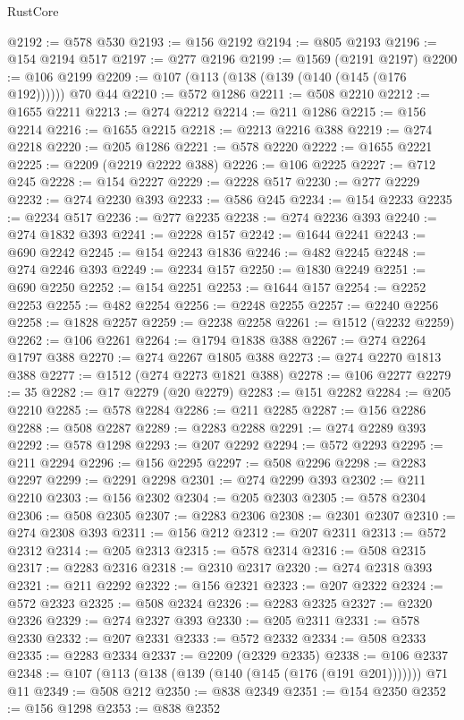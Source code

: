 \begin{lexlean}{RustCore}
\begin{coremodule}
@2192 := @578 @530
@2193 := @156 @2192
@2194 := @805 @2193
@2196 := @154 @2194 @517
@2197 := @277 @2196
@2199 := @1569 (@2191 @2197)
@2200 := @106 @2199
@2209 := @107 (@113 (@138 (@139 (@140 (@145 (@176 @192)))))) @70 @44
@2210 := @572 @1286
@2211 := @508 @2210
@2212 := @1655 @2211
@2213 := @274 @2212
@2214 := @211 @1286
@2215 := @156 @2214
@2216 := @1655 @2215
@2218 := @2213 @2216 @388
@2219 := @274 @2218
@2220 := @205 @1286
@2221 := @578 @2220
@2222 := @1655 @2221
@2225 := @2209 (@2219 @2222 @388)
@2226 := @106 @2225
@2227 := @712 @245
@2228 := @154 @2227
@2229 := @2228 @517
@2230 := @277 @2229
@2232 := @274 @2230 @393
@2233 := @586 @245
@2234 := @154 @2233
@2235 := @2234 @517
@2236 := @277 @2235
@2238 := @274 @2236 @393
@2240 := @274 @1832 @393
@2241 := @2228 @157
@2242 := @1644 @2241
@2243 := @690 @2242
@2245 := @154 @2243 @1836
@2246 := @482 @2245
@2248 := @274 @2246 @393
@2249 := @2234 @157
@2250 := @1830 @2249
@2251 := @690 @2250
@2252 := @154 @2251
@2253 := @1644 @157
@2254 := @2252 @2253
@2255 := @482 @2254
@2256 := @2248 @2255
@2257 := @2240 @2256
@2258 := @1828 @2257
@2259 := @2238 @2258
@2261 := @1512 (@2232 @2259)
@2262 := @106 @2261
@2264 := @1794 @1838 @388
@2267 := @274 @2264 @1797 @388
@2270 := @274 @2267 @1805 @388
@2273 := @274 @2270 @1813 @388
@2277 := @1512 (@274 @2273 @1821 @388)
@2278 := @106 @2277
@2279 := 35
@2282 := @17 @2279 (@20 @2279)
@2283 := @151 @2282
@2284 := @205 @2210
@2285 := @578 @2284
@2286 := @211 @2285
@2287 := @156 @2286
@2288 := @508 @2287
@2289 := @2283 @2288
@2291 := @274 @2289 @393
@2292 := @578 @1298
@2293 := @207 @2292
@2294 := @572 @2293
@2295 := @211 @2294
@2296 := @156 @2295
@2297 := @508 @2296
@2298 := @2283 @2297
@2299 := @2291 @2298
@2301 := @274 @2299 @393
@2302 := @211 @2210
@2303 := @156 @2302
@2304 := @205 @2303
@2305 := @578 @2304
@2306 := @508 @2305
@2307 := @2283 @2306
@2308 := @2301 @2307
@2310 := @274 @2308 @393
@2311 := @156 @212
@2312 := @207 @2311
@2313 := @572 @2312
@2314 := @205 @2313
@2315 := @578 @2314
@2316 := @508 @2315
@2317 := @2283 @2316
@2318 := @2310 @2317
@2320 := @274 @2318 @393
@2321 := @211 @2292
@2322 := @156 @2321
@2323 := @207 @2322
@2324 := @572 @2323
@2325 := @508 @2324
@2326 := @2283 @2325
@2327 := @2320 @2326
@2329 := @274 @2327 @393
@2330 := @205 @2311
@2331 := @578 @2330
@2332 := @207 @2331
@2333 := @572 @2332
@2334 := @508 @2333
@2335 := @2283 @2334
@2337 := @2209 (@2329 @2335)
@2338 := @106 @2337
@2348 := @107 (@113 (@138 (@139 (@140 (@145 (@176 (@191 @201))))))) @71 @11
@2349 := @508 @212
@2350 := @838 @2349
@2351 := @154 @2350
@2352 := @156 @1298
@2353 := @838 @2352

\end{coremodule}
\end{lexlean}
